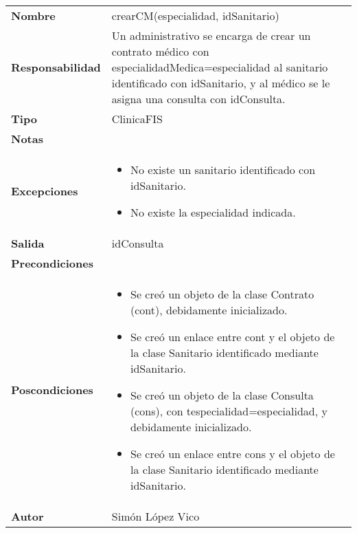 \documentclass[11pt,a4paper]{article}
\begin{document}
\begin{table}[H]
	\centering
	\label{my-label}
	\begin{tabularx}{\textwidth}{l|X}
		\textbf{Nombre}          & crearCM(especialidad, idSanitario) \\
		\textbf{Responsabilidad} & Un administrativo se encarga de crear un contrato médico con especialidadMedica=especialidad al sanitario identificado con idSanitario, y al médico se le asigna una consulta con idConsulta. \\
		\textbf{Tipo}            & ClinicaFIS \\
		\textbf{Notas}           & \\
		\textbf{Excepciones}     &
		\begin{itemize}
			\item No existe un sanitario identificado con idSanitario.
			\item No existe la especialidad indicada.
		\end{itemize} \\
		\textbf{Salida}          & idConsulta \\
		\textbf{Precondiciones}  & \\
		\textbf{Poscondiciones}  & 
		\begin{itemize}
			\item Se creó un objeto de la clase Contrato (cont), debidamente inicializado.
			\item Se creó un enlace entre cont y el objeto de la clase Sanitario identificado mediante idSanitario.
			\item Se creó un objeto de la clase Consulta (cons), con tespecialidad=especialidad, y debidamente inicializado.
			\item Se creó un enlace entre cons y el objeto de la clase Sanitario identificado mediante idSanitario.
		\end{itemize} \\
		\textbf{Autor}			 & Simón López Vico
	\end{tabularx}
\end{table}
\end{document}
